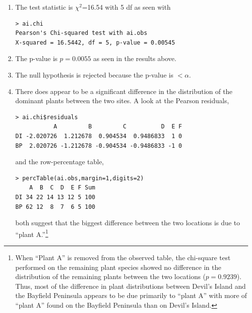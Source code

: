 \documentclass[10pt,openany]{book}\usepackage[]{graphicx}\usepackage[]{color}
\makeatletter
\newenvironment{kframe}{%
 \def\at@end@of@kframe{}%
 \ifinner\ifhmode%
  \def\at@end@of@kframe{\end{minipage}}%
  \begin{minipage}{\columnwidth}%
 \fi\fi%
 \def\FrameCommand##1{\hskip\@totalleftmargin \hskip-\fboxsep
 \colorbox{shadecolor}{##1}\hskip-\fboxsep
     \hskip-\linewidth \hskip-\@totalleftmargin \hskip\columnwidth}%
 \MakeFramed {\advance\hsize-\width
   \@totalleftmargin\z@ \linewidth\hsize
   \@setminipage}}%
 {\par\unskip\endMakeFramed%
 \at@end@of@kframe}
\newenvironment{knitrout}{}{} %
\makeatother
\begin{document}
\begin{enumerate}
    \item The test statistic is $\chi^{2}$=16.54 with 5 df as seen with
\begin{knitrout}
\color{fgcolor}\begin{kframe}
\begin{verbatim}
> ai.chi
Pearson's Chi-squared test with ai.obs 
X-squared = 16.5442, df = 5, p-value = 0.00545
\end{verbatim}
\end{kframe}
\end{knitrout}
    \item The p-value is $p=0.0055$ as seen in the results above.
    \item The null hypothesis is rejected because the p-value is $<\alpha$.
    \item There does appear to be a significant difference in the distribution of the dominant plants between the two sites.  A look at the Pearson residuals,
\begin{knitrout}
\color{fgcolor}\begin{kframe}
\begin{verbatim}
> ai.chi$residuals
           A         B         C          D  E F
DI -2.020726  1.212678  0.904534  0.9486833  1 0
BP  2.020726 -1.212678 -0.904534 -0.9486833 -1 0
\end{verbatim}
\end{kframe}
\end{knitrout}
and the row-percentage table,
\begin{knitrout}
\color{fgcolor}\begin{kframe}
\begin{verbatim}
> percTable(ai.obs,margin=1,digits=2)
    A  B  C  D  E F Sum
DI 34 22 14 13 12 5 100
BP 62 12  8  7  6 5 100
\end{verbatim}
\end{kframe}
\end{knitrout}

both suggest that the biggest difference between the two locations is due to ``plant A.''\footnote{When ``Plant A'' is removed from the observed table, the chi-square test performed on the remaining plant species showed no difference in the distribution of the remaining plants between the two locations ($p=0.9239$).  Thus, most of the difference in plant distributions between Devil's Island and the Bayfield Peninsula appears to be due primarily to ``plant A'' with more of ``plant A'' found on the Bayfield Peninsula than on Devil's Island.}
  \end{enumerate}
\end{document}
